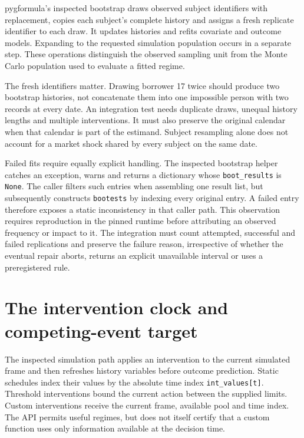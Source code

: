 pygformula's inspected bootstrap draws observed subject identifiers with
replacement, copies each subject's complete history and assigns a fresh replicate
identifier to each draw. It updates histories and refits covariate and outcome
models. Expanding to the requested simulation population occurs in a separate
step. These operations distinguish the observed sampling unit from the Monte
Carlo population used to evaluate a fitted regime. \citep{v131_sw_pygformula}

The fresh identifiers matter. Drawing borrower 17 twice should produce two
bootstrap histories, not concatenate them into one impossible person with two
records at every date. An integration test needs duplicate draws, unequal
history lengths and multiple interventions. It must also preserve the original
calendar when that calendar is part of the estimand. Subject resampling alone
does not account for a market shock shared by every subject on the same date.

Failed fits require equally explicit handling. The inspected bootstrap helper
catches an exception, warns and returns a dictionary whose
\texttt{boot\_results} is \texttt{None}. The caller filters such entries when
assembling one result list, but subsequently constructs \texttt{bootests} by
indexing every original entry. A failed entry therefore exposes a static
inconsistency in that caller path. This observation requires reproduction in
the pinned runtime before attributing an observed frequency or impact to it.
The integration must count attempted, successful and failed replications and
preserve the failure reason, irrespective of whether the eventual repair
aborts, returns an explicit unavailable interval or uses a preregistered rule.
\citep{v13_sw_pygformula,v131_sw_pygformula}

\section{The intervention clock and competing-event target}

The inspected simulation path applies an intervention to the current simulated
frame and then refreshes history variables before outcome prediction. Static
schedules index their values by the absolute time index \texttt{int\_values[t]}.
Threshold interventions bound the current action between the supplied limits.
Custom interventions receive the current frame, available pool and time index.
The API permits useful regimes, but does not itself certify that a custom
function uses only information available at the decision time.
\citep{v131_sw_pygformula}

